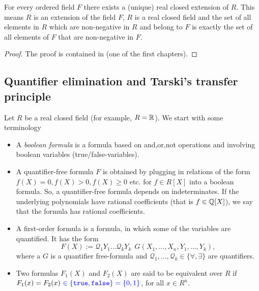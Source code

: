 \begin{theorem}
	\label{thm:extending:to:real:closed}
	For every ordered field $F$ there exists a (unique) real closed extension of $R$. This means $R$ is an extension of the field $F$, $R$ is a real closed field and the set of all elements in $R$ which are non-negative in $R$ and belong to $F$ is exactly the set of all elements of $F$ that are non-negative in $F$. 
\end{theorem}
\begin{proof}
	The proof is contained in \cite{Bochnak:Coste:Roy:1998} (one of the first chapters). 
\end{proof}

\subsection{Quantifier elimination and Tarski's transfer principle}

Let $R$ be a real closed field (for example, $R=\mathbb{R}$).  We start with some terminology
\begin{itemize}
	\item A \emph{boolean formula} is a formula based on and,or,not operations and involving boolean variables (true/false-variables).
	\item A quantifier-free formula $F$ is obtained by plugging in relations of the form $f(X)=0, f(X)>0, f(X) \ge 0$ etc. for $f \in R[X]$ into a boolean formula. So, a quantifier-free formula depends on indeterminates. If the underlying polynomials have rational coefficients (that is $f \in \mathbb{Q}[X]$), we say that the formula has rational coefficients.
	\item A first-order formula is a formula, in which some of the variables are quantified. It has the form 
	\[
		F(X):= \mathcal{Q}_1 Y_1 \ldots \mathcal{Q}_k Y_k \ \ G(X_1,\ldots,X_n,Y_1,\ldots,Y_k),
	\] where a $G$ is a quantifier free-formula and $\mathcal{Q}_1,\ldots,\mathcal{Q}_k \in \{ \forall, \exists\}$ are quantifiers.
	\item Two formulas $F_1(X)$ and $F_2(X)$ are said to be equivalent over $R$ if $F_1(x)=F_2(x) \ \textcolor{blue}{\in \{\texttt{true},\texttt{false}\} = \{0,1\}}$, for all $x \in R^n$. 
\end{itemize}


